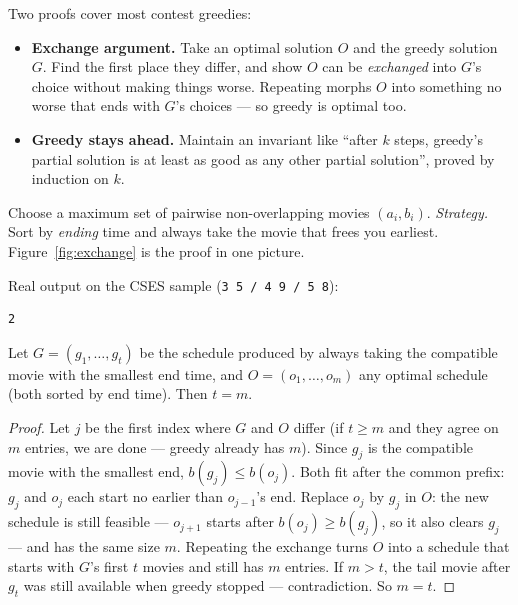 Two proofs cover most contest greedies:

\begin{itemize}
\item \textbf{Exchange argument.} Take an optimal solution $O$ and the
greedy solution $G$. Find the first place they differ, and show $O$ can
be \emph{exchanged} into $G$'s choice without making things worse.
Repeating morphs $O$ into something no worse that ends with $G$'s
choices --- so greedy is optimal too.
\item \textbf{Greedy stays ahead.} Maintain an invariant like ``after $k$
steps, greedy's partial solution is at least as good as any other partial
solution'', proved by induction on $k$.
\end{itemize}

\begin{example}
\label{ex:movie}
Choose a maximum set of pairwise non-overlapping movies
$(a_i, b_i)$. \emph{Strategy.} Sort by \emph{ending} time and always take
the movie that frees you earliest. Figure~\ref{fig:exchange} is the proof
in one picture.
\end{example}

Real output on the CSES sample (\texttt{3 5 / 4 9 / 5 8}):
\begin{lstlisting}[numbers=none]
2
\end{lstlisting}

\begin{theorem}
\label{thm:movie}
Let $G = (g_1, \dots, g_t)$ be the schedule produced by always taking the
compatible movie with the smallest end time, and $O = (o_1, \dots, o_m)$
any optimal schedule (both sorted by end time). Then $t = m$.
\end{theorem}
\begin{proof}
Let $j$ be the first index where $G$ and $O$ differ (if $t \ge m$ and they
agree on $m$ entries, we are done --- greedy already has $m$). Since
$g_j$ is the compatible movie with the smallest end, $b(g_j) \le b(o_j)$.
Both fit after the common prefix: $g_j$ and $o_j$ each start no earlier
than $o_{j-1}$'s end. Replace $o_j$ by $g_j$ in $O$: the new schedule is
still feasible --- $o_{j+1}$ starts after $b(o_j) \ge b(g_j)$, so it also
clears $g_j$ --- and has the same size $m$. Repeating the exchange turns
$O$ into a schedule that starts with $G$'s first $t$ movies and still has
$m$ entries. If $m > t$, the tail movie after $g_t$ was still available
when greedy stopped --- contradiction. So $m = t$.
\end{proof}

